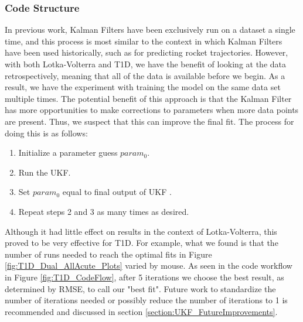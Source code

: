 \subsubsection{Code Structure}
In previous work, Kalman Filters have been exclusively run on a dataset a single time, and this process is most similar to the context in which Kalman Filters have been used historically, such as for predicting rocket trajectories. However, with both Lotka-Volterra and T1D, we have the benefit of looking at the data retrospectively, meaning that all of the data is available before we begin. As a result, we have the experiment with training the model on the same data set multiple times. The potential benefit of this approach is that the Kalman Filter has more opportunities to make corrections to parameters when more data points are present. Thus, we suspect that this can improve the final fit. The process for doing this is as follows:
\begin{enumerate}
    \item Initialize a parameter guess $param_0$.
    \item Run the UKF.
    \item Set $param_0$ equal to final output of UKF .
    \item Repeat steps 2 and 3 as many times as desired.
\end{enumerate}
Although it had little effect on results in the context of Lotka-Volterra, this proved to be very effective for T1D. For example, what we found is that the number of runs needed to reach the optimal fits in Figure \ref{fig:T1D_Dual_AllAcute_Plots} varied by mouse. As seen in the code workflow in Figure \ref{fig:T1D_CodeFlow}, after 5 iterations we choose the best result, as determined by RMSE, to call our "best fit". Future work to standardize the number of iterations needed or possibly reduce the number of iterations to 1 is recommended and discussed in section \ref{section:UKF_FutureImprovements}.
